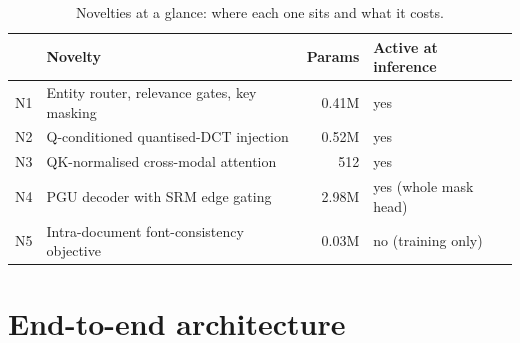 \documentclass[10pt,a4paper]{article}
\begin{document}
\begin{table}[!htbp]
\centering
\caption{Novelties at a glance: where each one sits and what it costs.}
\label{tab:novsum}
\begin{tabular}{@{}llrl@{}}
\toprule
 & Novelty & Params & Active at inference \\
\midrule
N1 & Entity router, relevance gates, key masking & 0.41M & yes \\
N2 & Q-conditioned quantised-DCT injection        & 0.52M & yes \\
N3 & QK-normalised cross-modal attention          & 512   & yes \\
N4 & PGU decoder with SRM edge gating             & 2.98M & yes (whole mask head) \\
N5 & Intra-document font-consistency objective    & 0.03M & no (training only) \\
\bottomrule
\end{tabular}
\end{table}

\section{End-to-end architecture}
\end{document}
